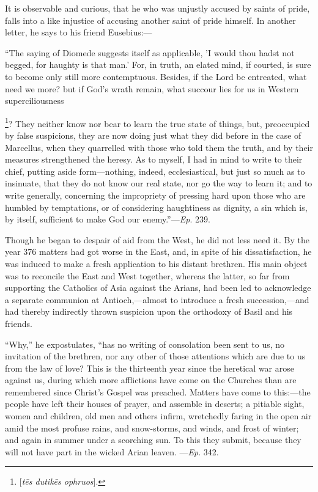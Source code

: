 It is observable and curious, that he who was unjustly accused by
saints of pride, falls into a like injustice of accusing another saint
of pride himself. In another letter, he says to his friend Eusebius:—

``The saying of Diomede suggests itself as applicable, 'I would
thou hadst not begged, for haughty is that man.' For, in truth, an
elated mind, if courted, is sure to become only still more
contemptuous. Besides, if the Lord be entreated, what need we more?
but if God's wrath remain, what succour lies for us in Western
superciliousness

\footnote{[\emph{t\={e}s
dutik\={e}s ophruos}].}? They
neither know nor bear to learn the true state of things, but,
preoccupied by false suspicions, they are now doing just what they did
before in the case of Marcellus, when they quarrelled with those who
told them the truth, and by their measures strengthened the heresy. As
to myself, I had in mind to write to their chief, putting aside form—nothing,
indeed, ecclesiastical, but just so much as to insinuate, that they do
not know our real state, nor go the way to learn it; and to write
generally, concerning the impropriety of pressing hard upon those who
are humbled by temptations, or of considering haughtiness as dignity,
a sin which is, by itself, sufficient to make God our enemy.''—\emph{Ep}.
239.

Though he began to despair of aid from the West, he did not less
need it. By the year 376 matters had got worse in the East, and, in
spite of his dissatisfaction, he was induced to make a fresh
application to his distant brethren. His main object was to reconcile
the East and West together, whereas the latter, so far from supporting
the Catholics of Asia against the Arians, had been led to
acknowledge a separate communion at Antioch,—almost to introduce a
fresh succession,—and had thereby indirectly thrown suspicion upon
the orthodoxy of Basil and his friends.

``Why,'' he expostulates, ``has no writing of
consolation been sent to us, no invitation of the brethren, nor any
other of those attentions which are due to us from the law of love?
This is the thirteenth year since the heretical war arose against us,
during which more afflictions have come on the Churches than are
remembered since Christ's Gospel was preached. Matters have come to
this:—the people have left their houses of prayer, and assemble in
deserts; a pitiable sight, women and children, old men and others
infirm, wretchedly faring in the open air amid the most profuse rains,
and snow-storms, and winds, and frost of winter; and again in summer
under a scorching sun. To this they submit, because they will not have
part in the wicked Arian leaven. —\emph{Ep}. 342.

